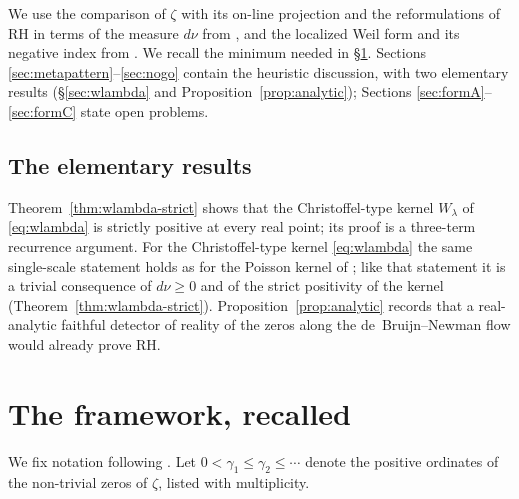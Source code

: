 \documentclass[11pt]{amsart}
\theoremstyle{definition}
\theoremstyle{remark}
\newcommand{\dnu}{d\nu}
\newcommand{\Wl}{W_\lambda}
\begin{document}
We use the comparison of $\zeta$ with its on-line projection and the reformulations of RH in
terms of the measure $\dnu$ from \cite{P24}, and the localized Weil form and its negative index
from \cite{P18,P25}. We recall the minimum needed in \S\ref{sec:framework}. Sections
\ref{sec:metapattern}--\ref{sec:nogo} contain the heuristic discussion, with two elementary
results (\S\ref{sec:wlambda} and Proposition~\ref{prop:analytic}); Sections
\ref{sec:formA}--\ref{sec:formC} state open problems.

\subsection{The elementary results}
Theorem~\ref{thm:wlambda-strict} shows that the Christoffel-type kernel $\Wl$ of
\eqref{eq:wlambda} is strictly positive at every real point; its proof is a three-term recurrence
argument. For the Christoffel-type kernel \eqref{eq:wlambda} the same single-scale statement
holds as for the Poisson kernel of \cite[Thm.~5.3]{P24}; like that statement it is a trivial
consequence of $d\nu\ge0$ \cite[Cor.~3.2]{P24} and of the strict positivity of the kernel
(Theorem~\ref{thm:wlambda-strict}). Proposition~\ref{prop:analytic} records that a real-analytic
faithful detector of reality of the zeros along the de~Bruijn--Newman flow would already prove
RH.

\section{The framework, recalled}\label{sec:framework}

We fix notation following \cite{P24}. Let $0<\gamma_1\le\gamma_2\le\cdots$ denote the positive
ordinates of the non-trivial zeros of $\zeta$, listed with multiplicity.
\end{document}
